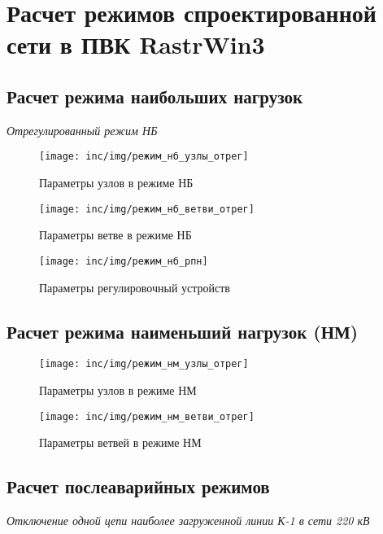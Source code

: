 \chapter{Расчет режимов спроектированной сети в ПВК RastrWin3}
\label{cha:растр_вин}

\section{Расчет режима наибольших нагрузок}

\textit{Отрегулированный режим НБ}

\begin{figure}[ht]
	\centering
	\texttt{[image: inc/img/режим\_нб\_узлы\_отрег]}
	\caption{Параметры узлов в режиме НБ}
	\label{fig:узлы_нб}
\end{figure}

\begin{figure}[ht]
	\centering
	\texttt{[image: inc/img/режим\_нб\_ветви\_отрег]}
	\caption{Параметры ветве в режиме НБ}
	\label{fig:ветви_нб}
\end{figure}

\begin{figure}[ht]
	\centering
	\texttt{[image: inc/img/режим\_нб\_рпн]}
	\caption{Параметры регулировочный устройств}
	\label{fig:анцапфы}
\end{figure}

\section{Расчет режима наименьший нагрузок (НМ)}

\begin{figure}[H]
	\centering
	\texttt{[image: inc/img/режим\_нм\_узлы\_отрег]}
	\caption{Параметры узлов в режиме НМ}
	\label{fig:узлы_нм}
\end{figure}

\begin{figure}[H]
	\centering
	\texttt{[image: inc/img/режим\_нм\_ветви\_отрег]}
	\caption{Параметры ветвей в режиме НМ}
	\label{fig:ветви_отрег}
\end{figure}

\section{Расчет послеаварийных режимов}

\textit{Отключение одной цепи наиболее загруженной линии К-1 в сети 220 кВ}

